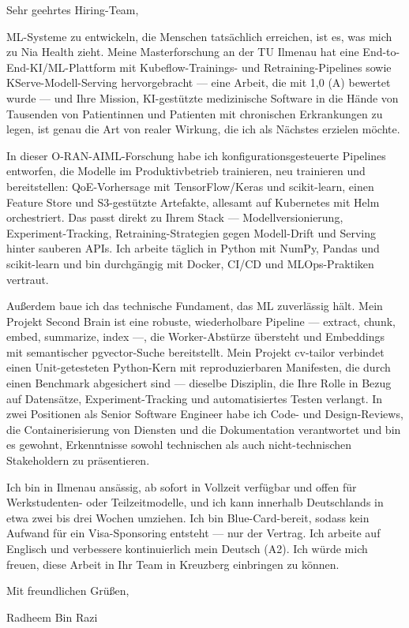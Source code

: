 \documentclass[11pt,a4paper]{coverletter}
\begin{document}
\opening{Sehr geehrtes Hiring-Team,}

ML-Systeme zu entwickeln, die Menschen tatsächlich erreichen, ist es, was mich zu Nia Health zieht. Meine Masterforschung an der TU Ilmenau hat eine End-to-End-KI/ML-Plattform mit Kubeflow-Trainings- und Retraining-Pipelines sowie KServe-Modell-Serving hervorgebracht — eine Arbeit, die mit 1,0 (A) bewertet wurde — und Ihre Mission, KI-gestützte medizinische Software in die Hände von Tausenden von Patientinnen und Patienten mit chronischen Erkrankungen zu legen, ist genau die Art von realer Wirkung, die ich als Nächstes erzielen möchte.

In dieser O-RAN-AIML-Forschung habe ich konfigurationsgesteuerte Pipelines entworfen, die Modelle im Produktivbetrieb trainieren, neu trainieren und bereitstellen: QoE-Vorhersage mit TensorFlow/Keras und scikit-learn, einen Feature Store und S3-gestützte Artefakte, allesamt auf Kubernetes mit Helm orchestriert. Das passt direkt zu Ihrem Stack — Modellversionierung, Experiment-Tracking, Retraining-Strategien gegen Modell-Drift und Serving hinter sauberen APIs. Ich arbeite täglich in Python mit NumPy, Pandas und scikit-learn und bin durchgängig mit Docker, CI/CD und MLOps-Praktiken vertraut.

Außerdem baue ich das technische Fundament, das ML zuverlässig hält. Mein Projekt Second Brain ist eine robuste, wiederholbare Pipeline — extract, chunk, embed, summarize, index —, die Worker-Abstürze übersteht und Embeddings mit semantischer pgvector-Suche bereitstellt. Mein Projekt cv-tailor verbindet einen Unit-getesteten Python-Kern mit reproduzierbaren Manifesten, die durch einen Benchmark abgesichert sind — dieselbe Disziplin, die Ihre Rolle in Bezug auf Datensätze, Experiment-Tracking und automatisiertes Testen verlangt. In zwei Positionen als Senior Software Engineer habe ich Code- und Design-Reviews, die Containerisierung von Diensten und die Dokumentation verantwortet und bin es gewohnt, Erkenntnisse sowohl technischen als auch nicht-technischen Stakeholdern zu präsentieren.

Ich bin in Ilmenau ansässig, ab sofort in Vollzeit verfügbar und offen für Werkstudenten- oder Teilzeitmodelle, und ich kann innerhalb Deutschlands in etwa zwei bis drei Wochen umziehen. Ich bin Blue-Card-bereit, sodass kein Aufwand für ein Visa-Sponsoring entsteht — nur der Vertrag. Ich arbeite auf Englisch und verbessere kontinuierlich mein Deutsch (A2). Ich würde mich freuen, diese Arbeit in Ihr Team in Kreuzberg einbringen zu können.

\closing{Mit freundlichen Grüßen,}{Radheem Bin Razi}
\end{document}
